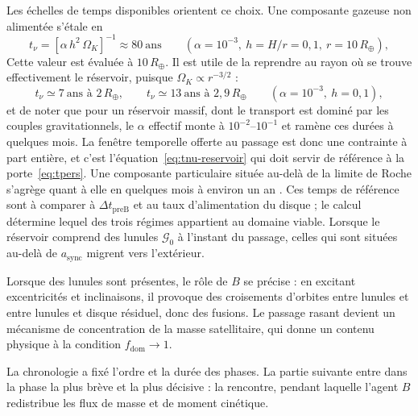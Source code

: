 \documentclass[11pt,a4paper,openany]{report}
\newcommand{\Rt}{R_{\oplus}}
\begin{document}
Les échelles de temps disponibles orientent ce choix. Une composante gazeuse non alimentée
s'étale en
\begin{equation}
t_\nu=\left[\alpha\,h^2\,\Omega_K\right]^{-1}\approx80\ \text{ans}
\qquad(\alpha=10^{-3},\ h=H/r=0{,}1,\ r=10\,\Rt),
\label{eq:tnu-num}
\end{equation}
Cette valeur est évaluée à $10\,\Rt$. Il est utile de la reprendre au rayon où se trouve
effectivement le réservoir, puisque $\Omega_K\propto r^{-3/2}$ :
\begin{equation}
t_\nu\simeq7\ \text{ans à }2\,\Rt,\qquad t_\nu\simeq13\ \text{ans à }2{,}9\,\Rt
\qquad(\alpha=10^{-3},\ h=0{,}1),
\label{eq:tnu-reservoir}
\end{equation}
et de noter que pour un réservoir massif, dont le transport est dominé par les couples
gravitationnels, le $\alpha$ effectif monte à $10^{-2}$--$10^{-1}$ et ramène ces durées à quelques
mois. La fenêtre temporelle offerte au passage est donc une contrainte à part entière, et c'est
l'équation~\eqref{eq:tnu-reservoir} qui doit servir de référence à la
porte~\eqref{eq:tpers}.
Une composante particulaire située au-delà de la limite de Roche s'agrège quant à elle en quelques
mois à environ un an \cite{Ida1997,Kokubo2000}. Ces temps de référence sont à comparer à
$\Delta t_{\mathrm{preB}}$ et au taux d'alimentation du disque ; le calcul détermine lequel des trois
régimes appartient au domaine viable. Lorsque le réservoir comprend des lunules
$\mathcal{G}_0$ à l'instant du passage, celles qui sont situées au-delà de $a_{\mathrm{sync}}$ migrent
vers l'extérieur.

\begin{lecture}
Lorsque des lunules sont présentes, le rôle de $B$ se précise : en excitant excentricités et inclinaisons, il provoque
des croisements d'orbites entre lunules et entre lunules et disque résiduel, donc des fusions.
Le passage rasant devient un mécanisme de concentration de la masse satellitaire, qui donne un
contenu physique à la condition $f_{\mathrm{dom}}\to1$.
\end{lecture}


\begin{rappel}
La chronologie a fixé l'ordre et la durée des phases. La partie suivante entre dans la phase la plus
brève et la plus décisive : la rencontre, pendant laquelle l'agent $B$ redistribue les flux de masse
et de moment cinétique.
\end{rappel}

\end{document}
